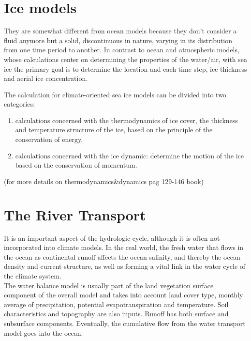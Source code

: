 \section{Ice models}

They are somewhat different from ocean models because they don't consider a fluid anymore but a solid, discontinuous in nature, varying in its distribution from one time period to another. In contrast to ocean and atmospheric models, whose calculations center on determining the properties of the water/air, with sea ice the primary goal is to determine the location and each time step, ice thickness and aerial ice concentration.



The calculation for climate-oriented sea ice models can be divided into two categories:

\begin{enumerate}
	\item calculations concerned with the thermodynamics of ice cover, the thickness and temperature structure of the ice, based on the principle of the conservation of energy.
	\item calculations concerned with the ice dynamic: determine the motion of the ice based on the conservation of momentum.
\end{enumerate}
(for more details on thermodynamics\&dynamics pag 129-146 book)

\section{The River Transport}

It is an important aspect of the hydrologic cycle, although it is often not incorporated into climate models. In the real world, the fresh water that flows in the ocean as continental runoff affects the ocean salinity, and thereby the ocean density and current structure, as well as forming a vital link in the water cycle of the climate system.\\




The water balance model is usually  part of the land vegetation surface component of the overall model and takes into account land cover type, monthly average of precipitation, potential evapotranspiration and temperature. Soil characteristics and topography are also inputs. Runoff has both surface and subsurface components. Eventually, the cumulative flow from the water transport model goes into the ocean.

